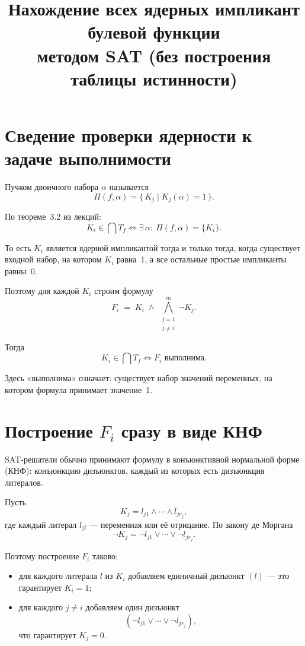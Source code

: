\documentclass[11pt]{article}
\title{\bfseries Нахождение всех ядерных импликант булевой функции\\
методом SAT (без построения таблицы истинности)}
\author{}
\date{}
\begin{document}
\maketitle
\vspace{-2.5em}

\section{Сведение проверки ядерности к задаче выполнимости}

Пучком двоичного набора $\alpha$ называется
\[
\Pi(f,\alpha)=\{\,K_j \mid K_j(\alpha)=1\,\}.
\]

По теореме~3.2 из лекций:
\[
K_i \in \bigcap T_f
\iff
\exists\,\alpha:\ \Pi(f,\alpha)=\{K_i\}.
\]

То есть $K_i$ является ядерной импликантой тогда и только тогда, когда существует входной набор, на котором $K_i$ равна~1, а все остальные простые импликанты равны~0.

Поэтому для каждой $K_i$ строим формулу
\[
\boxed{\;F_i \;=\; K_i \;\land\; \bigwedge_{\substack{j=1\\ j\ne i}}^{m} \neg K_j.\;}
\]

Тогда
\[
\boxed{\;K_i \in \bigcap T_f \iff F_i \text{ выполнима}.\;}
\]

Здесь «выполнима» означает: существует набор значений переменных, на котором формула принимает значение~1.

\section{Построение $F_i$ сразу в виде КНФ}

SAT-решатели обычно принимают формулу в конъюнктивной нормальной форме (КНФ): конъюнкцию дизъюнктов, каждый из которых есть дизъюнкция литералов.

Пусть
\[
K_j = l_{j1}\land\cdots\land l_{jr_j},
\]
где каждый литерал $l_{jt}$ — переменная или её отрицание. По закону де Моргана
\[
\neg K_j = \neg l_{j1}\vee\cdots\vee\neg l_{jr_j}.
\]

Поэтому построение $F_i$ таково:

\begin{itemize}
\item для каждого литерала $l$ из $K_i$ добавляем единичный дизъюнкт $(l)$ — это гарантирует $K_i=1$;
\item для каждого $j\ne i$ добавляем один дизъюнкт
\[
(\neg l_{j1}\vee\cdots\vee\neg l_{jr_j}),
\]
что гарантирует $K_j=0$.
\end{itemize}
\end{document}

